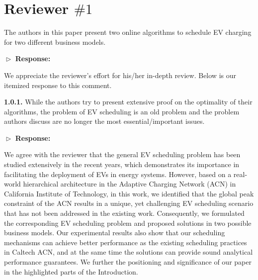 \documentclass[11pt]{article}
\begin{document}
\newpage
\section{Reviewer $\# 1$}
{\color{blue}}
%

{\color{blue}The authors in this paper present two online algorithms to schedule EV charging for two different business models.}
\vspace{3mm}

$\vartriangleright$ \noindent\textbf{Response:} 

We appreciate the reviewer's effort for his/her in-depth review. Below is our itemized response to this comment. 

\vspace{3mm}
{\color{blue}
\textbf{1.0.1.} While the authors try to present extensive proof on the optimality of their algorithms, the problem of EV scheduling is an old problem and the problem authors discuss are no longer the most essential/important issues. 
 }
\vspace{3mm}

	$\vartriangleright$ \noindent\textbf{Response:} 
	
We agree with the reviewer that the general EV scheduling problem has been studied extensively in the recent years, which demonstrates its importance in facilitating the deployment of EVs in energy systems. However, based on a real-world hierarchical architecture in the Adaptive Charging Network (ACN) in California Institute of Technology, in this work, we identified that the global peak constraint of the ACN results in a unique, yet challenging EV scheduling scenario that has not been addressed in the existing work.  Consequently, we formulated the corresponding EV scheduling problem and proposed solutions in two possible business models. Our experimental results also show that our scheduling mechanisms can achieve better performance as the existing scheduling practices in Caltech ACN, and at the same time the solutions can provide sound analytical performance guarantees. We further the positioning and significance of our paper in the highlighted parts of the Introduction.
	
\end{document}
